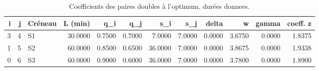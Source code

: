 \begin{table}[htbp]
\caption{Coefficients des paires doubles à l'optimum, durées donnees.}
\label{tab:pairs-donnees}
\begin{tabular}{rrlrrrrrrrrr}
\toprule
i & j & Créneau & L (min) & q\_i & q\_j & s\_i & s\_j & delta & w & gamma & coeff. z \\
\midrule
3 & 4 & S1 & 30.0000 & 0.7500 & 0.7000 & 7.0000 & 7.0000 & 0.0000 & 3.6750 & 0.0000 & 1.8375 \\
1 & 5 & S2 & 60.0000 & 0.8500 & 0.6500 & 36.0000 & 7.0000 & 0.0000 & 3.8675 & 0.0000 & 1.9338 \\
0 & 6 & S3 & 60.0000 & 0.9000 & 0.6000 & 36.0000 & 7.0000 & 0.0000 & 3.7800 & 0.0000 & 1.8900 \\
\bottomrule
\end{tabular}
\end{table}

